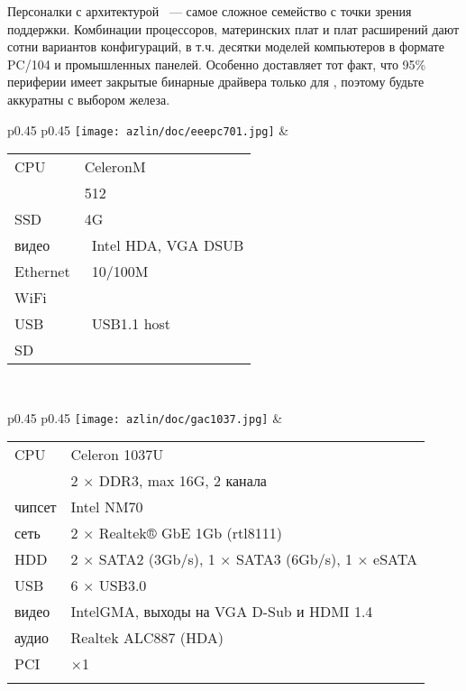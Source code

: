 
\secdown{}

Персоналки с архитектурой \ --- самое сложное семейство с точки
зрения поддержки. Комбинации процессоров, материнских плат и плат расширений
дают сотни вариантов конфигураций, в т.ч. десятки моделей компьютеров в формате
PC/104 и промышленных панелей. Особенно доставляет тот факт, что 95\% периферии
имеет закрытые бинарные драйвера только для \win, поэтому будьте аккуратны с
выбором железа.



\clearpage
{}\label{eeepc701}

\bigskip
\begin{tabular}{p{} p{}}
\texttt{[image: azlin/doc/eeepc701.jpg]}
&
\begin{tabular}{l l}
CPU & CeleronM \\
\ram & 512 \\
SSD & 4G \\
видео & \checkbox\ Intel HDA, VGA DSUB \\
Ethernet & \checkbox\ 10/100M \\
WiFi & \checkbox\ \\
USB & \checkbox\ USB1.1 host \\
SD & \checkbox \\
\end{tabular}
\\
\end{tabular}

\bigskip


\clearpage
{}

\begin{tabular}{p{0.45\textheight} p{0.45\textheight}}
\texttt{[image: azlin/doc/gac1037.jpg]} &
\begin{tabular}{l l}
CPU & Celeron 1037U \\
\ram & 2 $\times$ DDR3, max 16G, 2 канала \\
чипсет & Intel NM70 \\
сеть & 2 $\times$ Realtek® GbE 1Gb (rtl8111) \\
HDD & 2 $\times$ SATA2 (3Gb/s), 1 $\times$ SATA3 (6Gb/s), 1 $\times$ eSATA\\
USB & 6 $\times$ USB3.0 \\
видео & IntelGMA, выходы на VGA D-Sub и HDMI 1.4\\
аудио & Realtek ALC887 (HDA) \\
PCI & $\times$1 \\
&\\
\end{tabular}
\\
\end{tabular}

